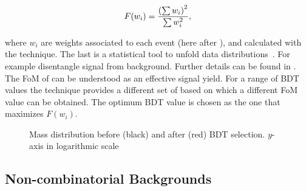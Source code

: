 \begin{equation}
  \centering
  F(w_i) = \frac{\left(\sum{w_{i}}\right)^2}{\sum{w_{i}^2}},
\label{eqn:fom}
\end{equation}

\noindent where $w_i$ are weights associated to each event (here after \sWeights), and calculated with the \sPlot
technique. The last  is a statistical tool to unfold data distributions~\cite{splot}. For example disentangle signal from background.
Further details can be found in . The FoM of  can be understood as an effective signal yield.
For a range of BDT values the \sPlot technique provides a different set of \sWeights based on which a different FoM value can be obtained.
The optimum BDT value is chosen as the one that maximizes $F(w_i)$.

\begin{figure}[h]
\begin{center}
  \scalebox{1}{}
  \caption{Mass distribution before (black) and after (red) BDT selection. $y$-axis in logarithmic scale}
  \label{mass_BDTG_selection}
\end{center}
\end{figure}

\subsection{Non-combinatorial Backgrounds}
\label{peaking_backgrounds}

